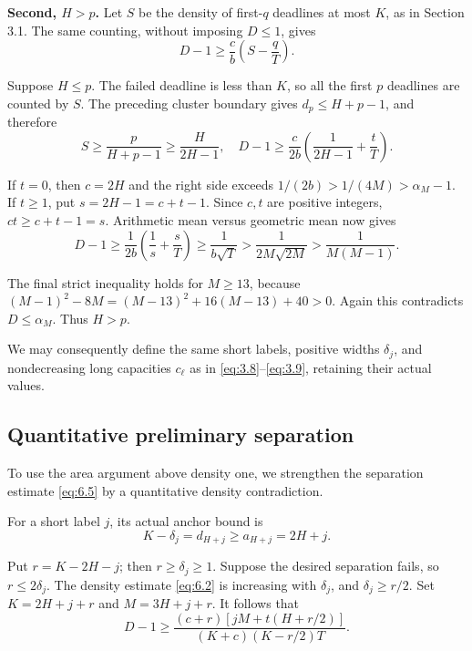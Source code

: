 \documentclass[11pt,a4paper]{article}
\begin{document}
\textbf{Second, \(H>p\).} Let \(S\) be the density of first-\(q\) deadlines at most \(K\), as in Section 3.1. The same counting, without imposing \(D\le1\), gives
\begin{equation}
D-1\ge\frac cb\left(S-\frac qT\right).
\tag{8.10}
\label{eq:8.10}
\end{equation}

Suppose \(H\le p\). The failed deadline is less than \(K\), so all the first \(p\) deadlines are counted by \(S\). The preceding cluster boundary gives \(d_p\le H+p-1\), and therefore
\begin{equation}
S\ge\frac p{H+p-1}\ge\frac H{2H-1},
\quad
D-1\ge\frac{c}{2b}
 \left(\frac1{2H-1}+\frac tT\right).
\tag{8.11}
\label{eq:8.11}
\end{equation}

If \(t=0\), then \(c=2H\) and the right side exceeds \(1/(2b)>1/(4M)>\alpha_M-1\). If \(t\ge1\), put \(s=2H-1=c+t-1\). Since \(c,t\) are positive integers, \(ct\ge c+t-1=s\). Arithmetic mean versus geometric mean now gives
\[
D-1\ge\frac1{2b}\left(\frac1s+\frac sT\right)
\ge\frac1{b\sqrt T}
>\frac1{2M\sqrt{2M}}
>\frac1{M(M-1)}.
\]

The final strict inequality holds for \(M\ge13\), because \((M-1)^2-8M=(M-13)^2+16(M-13)+40>0\). Again this contradicts \(D\le\alpha_M\). Thus \(H>p\).

We may consequently define the same short labels, positive widths \(\delta_j\), and nondecreasing long capacities \(c_\ell\) as in \eqref{eq:3.8}--\eqref{eq:3.9}, retaining their actual values.

\hypertarget{quantitative-preliminary-separation}{%
\subsection{Quantitative preliminary separation}\label{quantitative-preliminary-separation}}

To use the area argument above density one, we strengthen the separation estimate \eqref{eq:6.5} by a quantitative density contradiction.

For a short label \(j\), its actual anchor bound is
\[
K-\delta_j=d_{H+j}\ge a_{H+j}=2H+j.
\]

Put \(r=K-2H-j\); then \(r\ge\delta_j\ge1\). Suppose the desired separation fails, so \(r\le2\delta_j\). The density estimate \eqref{eq:6.2} is increasing with \(\delta_j\), and \(\delta_j\ge r/2\). Set \(K=2H+j+r\) and \(M=3H+j+r\). It follows that
\begin{equation}
D-1\ge
\frac{(c+r)[jM+t(H+r/2)]}
 {(K+c)(K-r/2)T}.
\tag{8.12}
\label{eq:8.12}
\end{equation}
\end{document}
